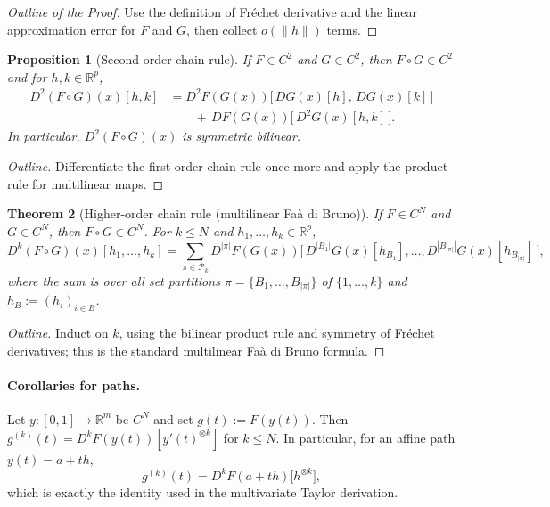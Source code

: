 \documentclass[12pt]{article}
\newtheorem{theorem}{Theorem}[section]
\newtheorem{proposition}[theorem]{Proposition}
\begin{document}
\begin{proof}[Outline of the Proof]
Use the definition of Fr\'echet derivative and the linear approximation error for $F$ and $G$, then collect $o(\|h\|)$ terms.
\end{proof}

\begin{proposition}[Second-order chain rule]
If $F\in C^2$ and $G\in C^2$, then $F\circ G\in C^2$ and for $h,k\in\mathbb{R}^p$,
\[
\begin{aligned}
D^2(F\circ G)(x)[h,k]
&= D^2F(G(x))\big[\,DG(x)[h],\,DG(x)[k]\,\big]
\\[-2pt]&\qquad +\, DF(G(x))\big[\,D^2G(x)[h,k]\,\big].
\end{aligned}
\]
In particular, $D^2(F\circ G)(x)$ is symmetric bilinear.
\end{proposition}

\begin{proof}[Outline]
Differentiate the first-order chain rule once more and apply the product rule for multilinear maps.
\end{proof}

\begin{theorem}[Higher-order chain rule (multilinear Fa\`a di Bruno)]
If $F\in C^{N}$ and $G\in C^{N}$, then $F\circ G\in C^{N}$. For $k\le N$ and $h_1,\dots,h_k\in\mathbb{R}^p$,
\[
D^{k}(F\circ G)(x)[h_1,\dots,h_k]
=\!\!\sum_{\pi\in \mathcal{P}_k}\!\!
D^{|\pi|}F(G(x))\Big[\, D^{|B_1|}G(x)[h_{B_1}],\dots, D^{|B_{|\pi|}|}G(x)[h_{B_{|\pi|}}]\,\Big],
\]
where the sum is over all set partitions $\pi=\{B_1,\dots,B_{|\pi|}\}$ of $\{1,\dots,k\}$ and
$h_{B}:=(h_i)_{i\in B}$.
\end{theorem}

\begin{proof}[Outline]
Induct on $k$, using the bilinear product rule and symmetry of Fr\'echet derivatives; this is the standard multilinear Fa\`a di Bruno formula.
\end{proof}

\paragraph{Corollaries for paths.}
Let $y:[0,1]\to\mathbb{R}^m$ be $C^{N}$ and set $g(t):=F(y(t))$.
Then $g^{(k)}(t)=D^{k}F(y(t))[y'(t)^{\otimes k}]$ for $k\le N$.
In particular, for an affine path $y(t)=a+th$,
\[
g^{(k)}(t)=D^{k}F(a+th)\big[h^{\otimes k}\big],
\]
which is exactly the identity used in the multivariate Taylor derivation.
\end{document}
